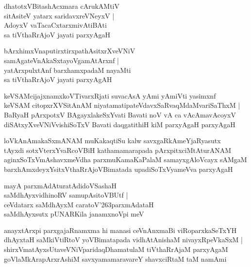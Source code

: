 \documentclass[twoside,12pt,openright]{book}
\def\S{\char'263}
\newcounter{shloka}[chapter]
\begin{document}
\begin{shloka}%
dhatotxVBitashAcxmara cArukAMtiV \\
sitAsiteV yatarx saridavxreVNeyxV |\\
AdoyxV vaTacaCxtarxmivAtiBAti \\
sa tiVthaRrAjoV jayati parxyAgaH
\end{shloka}

\begin{shloka}%
bArxhimxVnaputirxtirxpathAsitxrXveVNiV \\
samAgateVnAkaSxtayoVgamAtArxnf |\\
yatArxpulxtAnf barxhamxpadaM nayaMti \\
sa tiVthaRrAjoV jayati parxyAgAH 
\end{shloka}

\begin{shloka}%
keVSAMcijajxnamxkoVTivarxRjati suvacAsA yAmi yAmiVti yasimxnf \\
keVSAM citopxrXVSitAnAM niyatamatipateVdavxSaRvaqMdaMvariSaThxM |\\
BaRyaH pArxpotxV BAgayxlakeSxYvati Bavati noV vA ca vAcAmavAcoyxV \\
diSAtxyXveVNiVvishiSoTxV Bavati daqgatithiH kiM parxyAgaH parxyAgaH
\end{shloka}

\begin{shloka}%
loVkAnAmakaSxmANAM muKakaqtiSu kalw savxgaRkAmeYjaRyasutx \\
tAyxdi sotxVterxYvaRcoVBiH kathamamarapada pArxpitxciMtAturANAM \\
aginxSoTxVmAshavxmeVdha parxmuKamaKaPalaM samayxgAloVcayx sAMgaM \\
barxhAmxdeyxYsitxVthaRrAjoVBimatada upadiSoTxVyameVva parxyAgaH 
\end{shloka}

\begin{shloka}%
mayA parxmAdAturatAdidoVSashaH \\
saMdhAyxvidhinoRV samupAsitoVBUtf |\\
ceVdatarx saMdhAyxM caratoV\S parxmAdataH \\
saMdhAyxsutx pUNARKila janamxnoVpi meV
\end{shloka}

\begin{shloka}%
anayxtArxpi parxgajaRnamxma hi manasi ceVnAnxmaBi viRoparxkaSeTxYH \\
dhAyxtaH saMkiVtiRtoV yoVBimatapada vidhAtAnishaM nivayxRpeVkaSxM |\\
shirxVmatAyxsUtaveVNiVparidaqDhamatulaM tiVthaRrAjaM parxyAgaM \\
goVlaMkArapArxrAshiM savxyamamaravareY shavxciRtaM taM namAmi
\end{shloka}
\end{document}
